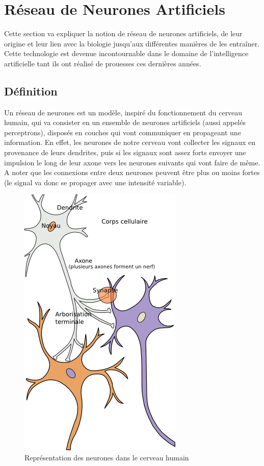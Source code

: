 \documentclass{article}
\begin{document}
\newpage
\section{Réseau de Neurones Artificiels}

Cette section va expliquer la notion de réseau de neurones artificiels, de leur origine et leur lien avec la biologie jusqu'aux différentes manières de les entraîner. Cette technologie est devenue incontournable dans le domaine de l'intelligence artificielle tant ils ont réalisé de prouesses ces dernières années.

\subsection{Définition}

Un réseau de neurones est un modèle, inspiré du fonctionnement du cerveau humain, qui va consister en un ensemble de neurones artificiels (aussi appelés perceptrons), disposés en couches qui vont communiquer en propageant une information\cite{wikiann}. En effet, les neurones de notre cerveau vont collecter les signaux en provenance de leurs dendrites, puis si les signaux sont assez forts envoyer une impulsion le long de leur axone vers les neurones suivants qui vont faire de même. A noter que les connexions entre deux neurones peuvent être plus ou moins fortes (le signal va donc se propager avec une intensité variable)\cite{neuronswork}.

\begin{figure}[H]
\begin{center}
	\includegraphics[scale=0.5]{neurones.png}
	\caption{Représentation des neurones dans le cerveau humain \cite{neurons}}
\end{center}
\end{figure}
\end{document}
